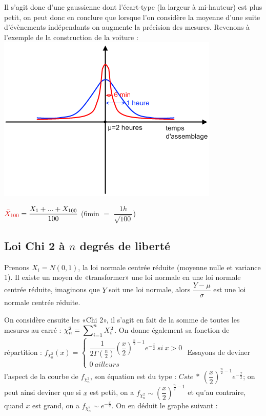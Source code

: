 \documentclass{article}
\begin{document}
Il s'agit donc d'une gaussienne dont l'écart-type (la largeur à mi-hauteur) est plus petit, on peut donc en conclure que
lorsque l'on considère la moyenne d'une suite d'évènements indépendants on augmente la précision des mesures. Revenons à
l'exemple de la construction de la voiture : \\
 
\includegraphics{Figure1-2.png}

$\textcolor{darkred}{\bar{X}_{100}} = \dfrac{X_1+...+X_{100}}{100}$ ($6$min $=$ $\dfrac{1h}{\sqrt{100}}$)

\subsection{Loi Chi 2 à $n$ degrés de liberté}

Prenons $X_i = N(0,1)$, la loi normale centrée réduite (moyenne nulle et variance 1). Il existe un moyen de «transformer»
une loi normale en une loi normale centrée réduite, imaginons que $Y$ soit une loi normale, alors $\dfrac{Y-\mu}{\sigma}$
est une loi normale centrée réduite.

On considère ensuite les «Chi 2», il s'agit en fait de la somme de toutes les mesures au carré : 
$\chi_n^2 = \sideset{}{_{i=1}^n}\sum{X_i^2}$. On donne également sa fonction de répartition : 
$f_{\chi^2_n}(x) = 
\left \{
\begin{array}{c}
 \dfrac{1}{2\Gamma(\frac{n}{2})}  (\dfrac{x}{2})^{\frac{n}{2}-1} e^{-\frac{x}{2}} \ si\ x>0\\
 0\ ailleurs
\end{array}
\right.$
Essayons de deviner l'aspect de la courbe de $f_{\chi_n^2}$, son équation est du type : $Cste\ *\ (\dfrac{x}{2})^{\frac{n}{2}-1}
e^{-\frac{x}{2}} $; on peut ainsi deviner que si $x$ est petit, on a $f_{\chi_n^2} \sim (\dfrac{x}{2})^{\frac{n}{2}-1}$ et qu'au
contraire, quand $x$ est grand, on a $f_{\chi_n^2} \sim e^{-\frac{x}{2}}$. On en déduit le graphe suivant : \\
\end{document}
